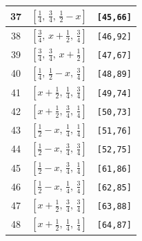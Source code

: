 \documentclass[fleqn,8pt]{jsarticle}
\begin{document}
\begin{longtable}{ccc}
37 & $\left[ \frac{1}{4},\, \frac{3}{4},\, \frac{1}{2} - x \right]$ & {\tt [45,66]} \\ \hline
38 & $\left[ \frac{3}{4},\, x + \frac{1}{2},\, \frac{3}{4} \right]$ & {\tt [46,92]} \\ \hline
39 & $\left[ \frac{3}{4},\, \frac{3}{4},\, x + \frac{1}{2} \right]$ & {\tt [47,67]} \\ \hline
40 & $\left[ \frac{1}{4},\, \frac{1}{2} - x,\, \frac{3}{4} \right]$ & {\tt [48,89]} \\ \hline
41 & $\left[ x + \frac{1}{2},\, \frac{1}{4},\, \frac{3}{4} \right]$ & {\tt [49,74]} \\ \hline
42 & $\left[ x + \frac{1}{2},\, \frac{3}{4},\, \frac{1}{4} \right]$ & {\tt [50,73]} \\ \hline
43 & $\left[ \frac{1}{2} - x,\, \frac{1}{4},\, \frac{1}{4} \right]$ & {\tt [51,76]} \\ \hline
44 & $\left[ \frac{1}{2} - x,\, \frac{3}{4},\, \frac{3}{4} \right]$ & {\tt [52,75]} \\ \hline
45 & $\left[ \frac{1}{2} - x,\, \frac{3}{4},\, \frac{1}{4} \right]$ & {\tt [61,86]} \\ \hline
46 & $\left[ \frac{1}{2} - x,\, \frac{1}{4},\, \frac{3}{4} \right]$ & {\tt [62,85]} \\ \hline
47 & $\left[ x + \frac{1}{2},\, \frac{3}{4},\, \frac{3}{4} \right]$ & {\tt [63,88]} \\ \hline
48 & $\left[ x + \frac{1}{2},\, \frac{1}{4},\, \frac{1}{4} \right]$ & {\tt [64,87]} \\
\end{longtable}
\renewcommand{\arraystretch}{1.2}
\end{document}

